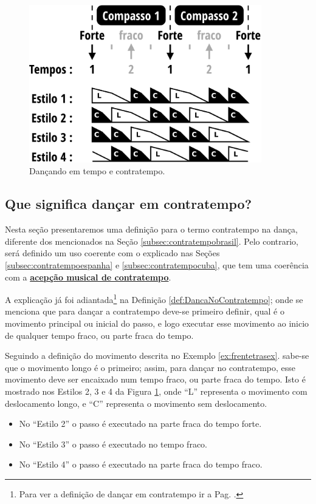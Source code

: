 \begin{figure}[h]
    \centering 
\includegraphics[width=0.9\textwidth]{chapters/cap-musicalidade/bailarcontratempo.eps}
    \caption{Dançando em tempo e contratempo.}\label{fig:tempovscontratempo}
\end{figure}

\subsection{Que significa dançar em contratempo?}
Nesta seção presentaremos uma definição para o termo contratempo na dança,
diferente dos mencionados na Seção \ref{subsec:contratempobrasil}.
Pelo contrario, será definido um uso coerente com o explicado nas 
Seções \ref{subsec:contratempoespanha} e \ref{subsec:contratempocuba},
que tem uma coerência com a \hyperref[sec:contratempo]{\textbf{acepção musical de contratempo}}.

A explicação já foi adiantada\footnote{Para 
ver a definição de dançar em contratempo ir a Pag. \pageref{def:DancaNoContratempo}.}
 na Definição \ref{def:DancaNoContratempo};
onde se menciona que para dançar a contratempo deve-se primeiro definir,
 qual é o movimento principal ou inicial do passo,
e logo executar esse movimento ao inicio de qualquer tempo fraco, ou parte fraca do tempo.

\begin{example}
Seguindo a definição do movimento descrita no Exemplo \ref{ex:frentetrasex}.
sabe-se que o movimento longo é o primeiro;
assim, para dançar no contratempo, esse movimento deve ser encaixado num tempo fraco,
ou parte fraca do tempo.
Isto é mostrado nos Estilos 2, 3 e 4 da Figura \ref{fig:tempovscontratempo},
onde ``L'' representa o movimento com deslocamento longo,
e ``C'' representa o movimento sem deslocamento.
\begin{itemize} 
\item No ``Estilo 2'' o passo é executado na parte fraca do tempo forte.
\item No ``Estilo 3'' o passo é executado no tempo fraco.
\item No ``Estilo 4'' o passo é executado na parte fraca do tempo fraco.
\end{itemize}
\end{example}
